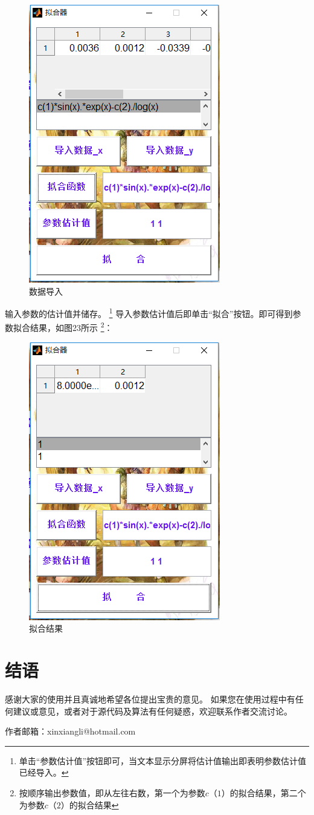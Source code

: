 \documentclass[UTF8]{ctexart}
\begin{document}
\begin{figure}[H]
\centering
\includegraphics[scale=0.4]{image/pic16.png}
\caption{数据导入}
\label{fig:pic16}
\end{figure}
输入参数的估计值并储存。
\footnote{单击“参数估计值”按钮即可，当文本显示分屏将估计值输出即表明参数估计值已经导入。}
导入参数估计值后即单击“拟合”按钮。即可得到参数拟合结果，如图23所示
\footnote{按顺序输出参数值，即从左往右数，第一个为参数$c（1）$的拟合结果，第二个为参数$c（2）$的拟合结果}：
\begin{figure}[H]
\centering
\includegraphics[scale=0.4]{image/pic17.png}
\caption{拟合结果}
\label{fig:pic17}
\end{figure}

\section{结语}
感谢大家的使用并且真诚地希望各位提出宝贵的意见。
如果您在使用过程中有任何建议或意见，或者对于源代码及算法有任何疑惑，欢迎联系作者交流讨论。

作者邮箱：xinxiangli@hotmail.com
\end{document}
